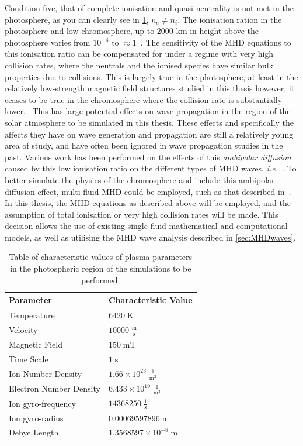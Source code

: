 \documentclass[a4paper,12pt,fourier,authoryear,custommargin]{Classes/PhDThesisPSnPDF}
\begin{document}
Condition five, that of complete ionisation and quasi-neutrality is not met in the photosphere, as you can clearly see in \cref{table:MHDvalues}, $n_e \neq n_i$.
The ionisation ration in the photosphere and low-chromosphere, up to $2000$ km in height above the photosphere varies from $10^{-4}$ to $\approx 1$~\citep{priest2014}.
The sensitivity of the MHD equations to this ionisation ratio can be compensated for under a regime with very high collision rates, where the neutrals and the ionised species have similar bulk properties due to collisions.
This is largely true in the photosphere, at least in the relatively low-strength magnetic field structures studied in this thesis however, it ceases to be true in the chromosphere where the collision rate is substantially lower.~\citep{khomenko2014}
This has large potential effects on wave propagation in the region of the solar atmosphere to be simulated in this thesis.
These effects and specifically the affects they have on wave generation and propagation are still a relatively young area of study, and have often been ignored in wave propagation studies in the past.
Various work has been performed on the effects of this \emph{ambipolar diffusion} caused by this low ionisation ratio on the different types of MHD waves, \emph{i.e.}~\cite{kumar2003,soler2010,zaqarashvili2011}.
To better simulate the physics of the chromosphere and include this ambipolar diffusion effect, multi-fluid MHD could be employed, such as that described in~\cite{khomenko2014}.
In this thesis, the MHD equations as described above will be employed, and the assumption of total ionisation or very high collision rates will be made.
This decision allows the use of existing single-fluid mathematical and computational models, as well as utilising the MHD wave analysis described in \cref{sec:MHDwaves}.


\begin{table}[]
\centering
\begin{tabular}{l|l}
Parameter & Characteristic Value \\
\hline
Temperature             & $6420 \; \mathrm{K}$
\\[5pt]
Velocity                & $10000 \; \mathrm{\frac{m}{s}}$
\\[5pt]
Magnetic Field          & $150 \; \mathrm{mT}$
\\[5pt]
Time Scale              & $1 \; \mathrm{s}$
\\[5pt]
Ion Number Density      & $1.66 \times 10^{23} \; \mathrm{\frac{1}{m^{3}}}$
\\[5pt]
Electron Number Density & $6.433 \times 10^{19} \; \mathrm{\frac{1}{m^{3}}}$
\\[5pt]
Ion gyro-frequency      & $14368250 \; \mathrm{\frac{1}{s}}$
\\[5pt]
Ion gyro-radius         & $0.00069597896 \; \mathrm{m}$
\\[5pt]
Debye Length            & $1.3568597 \times 10^{-8} \; \mathrm{m}$
\\[5pt]
\end{tabular}
\caption{Table of characteristic values of plasma parameters in the photospheric region of the simulations to be performed.}
\label{table:MHDvalues}
\end{table}
\end{document}
